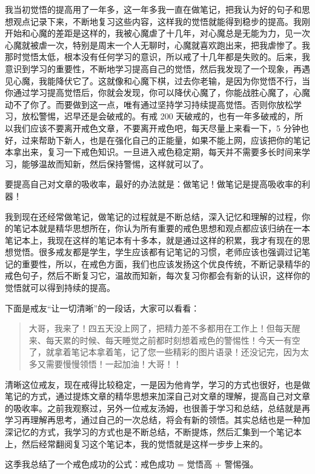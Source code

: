 \documentclass{ctexart}
\begin{document}
我当初觉悟的提高用了一年多，这一年多我一直在做笔记，把我认为好的句子和思想观点记录下来，不断地复习这些内容，这样我的觉悟就能得到稳步的提高。我刚开始和心魔的差距是这样的，我被心魔虐了十几年，对心魔总是无能为力，见一次心魔就被虐一次，特别是周末一个人无聊时，心魔就喜欢跑出来，把我虐惨了。我那时觉悟太低，根本没有任何学习的意识，所以戒了十几年都是失败的。后来，我意识到学习的重要性，不断地学习提高自己的觉悟，然后我发现了一个现象，再遇见心魔，我能降伏它了。这就像和心魔下棋，过去你老输，是因为你觉悟不行，当你通过学习提高觉悟后，你就会发现，你可以降伏心魔了，你能战胜心魔了，心魔动不了你了。而要做到这一点，唯有通过坚持学习持续提高觉悟。否则你放松学习，放松警惕，迟早还是会破戒的。有戒 200 天破戒的，也有一年多破戒的，所以我们应该不要离开戒色文章，不要离开戒色吧，每天尽量上来看一下，5 分钟也好，过来帮助下新人，也是在强化自己的正能量，如果不能上网，应该把你的笔记本拿出来，复习一下戒色知识。一旦进入戒色稳定期，每天并不需要多长时间来学习，能够温故而知新，然后保持警惕，这样就可以了。

要提高自己对文章的吸收率，最好的办法就是：做笔记！做笔记是提高吸收率的利器！

我到现在还经常做笔记，做笔记的过程就是不断总结，深入记忆和理解的过程，你的笔记本就是精华思想所在，你认为所有重要的戒色思想和观点都应该归纳在一本笔记本上，我现在这样的笔记本有十多本，就是通过这样的积累，我才有现在的思想觉悟。很多戒友都是学生，学生应该都有记笔记的习惯，老师应该也强调过记笔记的重要性，所以，在戒色方面，我们也应该发扬这个优良传统，不断记录精华的戒色句子，然后不断复习它，温故而知新，每次复习你都会有新的认识，这样你的觉悟就可以得到持续的提高。

下面是戒友“让一切清晰”的一段话，大家可以看看：

\begin{quote}
    大哥，我来了！四五天没上网了，把精力差不多都用在工作上！但每天醒来、每天累的时候、每天睡觉之前都时刻想着戒色的警惕性！今天一有空了，就拿着笔记本拿着笔，记了您一些精彩的图片语录！还没记完，因为太多又需要慢慢领悟！一起加油！大哥！！
\end{quote}

清晰这位戒友，现在戒得比较稳定，一是因为他肯学，学习的方式也很好，也是做笔记的方式，通过提炼文章的精华思想来加深自己对文章的理解，提高自己对文章的吸收率。之前我观察过，另外一位戒友汤姆，也很善于学习和总结，总结就是再学习再理解再思考，通过自己的一次总结，将会有新的领悟。其实总结也是一种加深记忆的方式，我学习的方式也是不断总结，不断提炼，然后汇集到一个笔记本上，然后经常翻阅复习这个笔记本，我的觉悟就是这样一步步上来的。

这季我总结了一个戒色成功的公式：戒色成功 = 觉悟高 + 警惕强。
\end{document}
